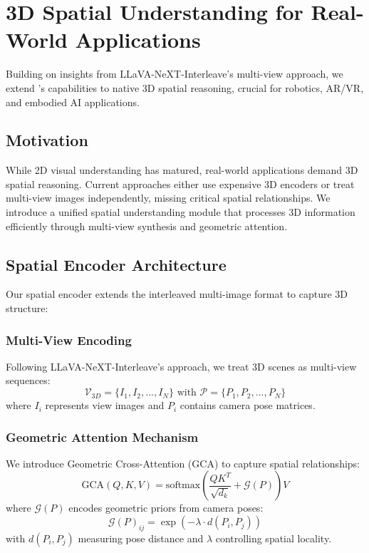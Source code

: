 \section{3D Spatial Understanding for Real-World Applications}

Building on insights from LLaVA-NeXT-Interleave's multi-view approach, we extend \zen{}'s capabilities to native 3D spatial reasoning, crucial for robotics, AR/VR, and embodied AI applications.

\subsection{Motivation}

While 2D visual understanding has matured, real-world applications demand 3D spatial reasoning. Current approaches either use expensive 3D encoders or treat multi-view images independently, missing critical spatial relationships. We introduce a unified spatial understanding module that processes 3D information efficiently through multi-view synthesis and geometric attention.

\subsection{Spatial Encoder Architecture}

Our spatial encoder extends the interleaved multi-image format to capture 3D structure:

\subsubsection{Multi-View Encoding}
Following LLaVA-NeXT-Interleave's approach, we treat 3D scenes as multi-view sequences:
\begin{equation}
\mathcal{V}_{3D} = \{I_1, I_2, ..., I_N\} \text{ with } \mathcal{P} = \{P_1, P_2, ..., P_N\}
\end{equation}
where $I_i$ represents view images and $P_i$ contains camera pose matrices.

\subsubsection{Geometric Attention Mechanism}
We introduce Geometric Cross-Attention (GCA) to capture spatial relationships:
\begin{equation}
\text{GCA}(Q, K, V) = \text{softmax}\left(\frac{QK^T}{\sqrt{d_k}} + \mathcal{G}(P)\right)V
\end{equation}
where $\mathcal{G}(P)$ encodes geometric priors from camera poses:
\begin{equation}
\mathcal{G}(P)_{ij} = \exp\left(-\lambda \cdot d(P_i, P_j)\right)
\end{equation}
with $d(P_i, P_j)$ measuring pose distance and $\lambda$ controlling spatial locality.

